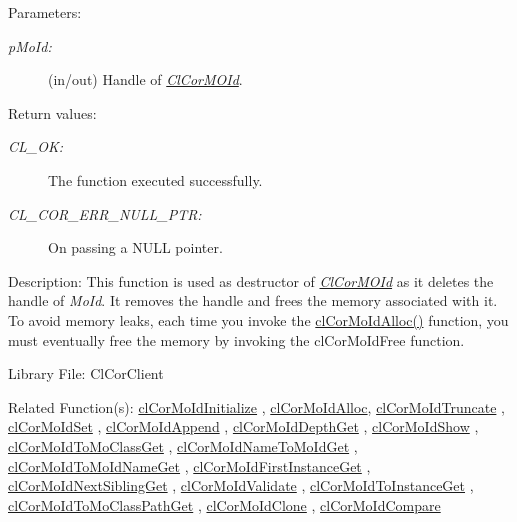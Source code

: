 \begin{Desc}
\item[Parameters:]
\begin{description}
\item[{\em p\-Mo\-Id:}](in/out) Handle of {\em \hyperlink{struct_cl_cor_m_o_id}{Cl\-Cor\-MOId}\/}.\end{description}
\end{Desc}
\begin{Desc}
\item[Return values:]
\begin{description}
\item[{\em CL\_\-OK:}]The function executed successfully. \item[{\em CL\_\-COR\_\-ERR\_\-NULL\_\-PTR:}]On passing a NULL pointer.\end{description}
\end{Desc}
\begin{Desc}
\item[Description:]This function is used as destructor of {\em \hyperlink{struct_cl_cor_m_o_id}{Cl\-Cor\-MOId}\/} as it deletes the handle of {\em Mo\-Id\/}. It removes the handle and frees the memory associated with it. To avoid memory leaks, each time you invoke the \hyperlink{group__group13_ga108}{cl\-Cor\-Mo\-Id\-Alloc()} function, you must eventually free the memory by invoking the cl\-Cor\-Mo\-Id\-Free function.\end{Desc}
\begin{Desc}
\item[Library File:]Cl\-Cor\-Client\end{Desc}
\begin{Desc}
\item[Related Function(s):]\hyperlink{group__group13}{cl\-Cor\-Mo\-Id\-Initialize} , \hyperlink{group__group13}{cl\-Cor\-Mo\-Id\-Alloc}, \hyperlink{group__group13}{cl\-Cor\-Mo\-Id\-Truncate} , \hyperlink{group__group13}{cl\-Cor\-Mo\-Id\-Set} , \hyperlink{group__group13}{cl\-Cor\-Mo\-Id\-Append} , \hyperlink{group__group13}{cl\-Cor\-Mo\-Id\-Depth\-Get} , \hyperlink{group__group13}{cl\-Cor\-Mo\-Id\-Show} , \hyperlink{group__group13}{cl\-Cor\-Mo\-Id\-To\-Mo\-Class\-Get} , \hyperlink{group__group13}{cl\-Cor\-Mo\-Id\-Name\-To\-Mo\-Id\-Get} , \hyperlink{group__group13}{cl\-Cor\-Mo\-Id\-To\-Mo\-Id\-Name\-Get} , \hyperlink{group__group13}{cl\-Cor\-Mo\-Id\-First\-Instance\-Get} , \hyperlink{group__group13}{cl\-Cor\-Mo\-Id\-Next\-Sibling\-Get} , \hyperlink{group__group13}{cl\-Cor\-Mo\-Id\-Validate} , \hyperlink{group__group13}{cl\-Cor\-Mo\-Id\-To\-Instance\-Get} , \hyperlink{group__group13}{cl\-Cor\-Mo\-Id\-To\-Mo\-Class\-Path\-Get} , \hyperlink{group__group13}{cl\-Cor\-Mo\-Id\-Clone} , \hyperlink{group__group13}{cl\-Cor\-Mo\-Id\-Compare} \end{Desc}

